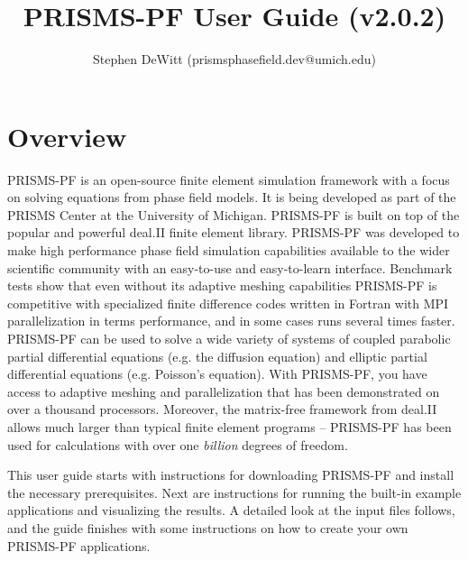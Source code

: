 \documentclass[10pt]{article} %
\title{PRISMS-PF User Guide (v2.0.2)}
\author{Stephen DeWitt (prismsphasefield.dev@umich.edu)}
\begin{document}
\posttitle{\end{center}}

\begin{titlingpage}
\maketitle
\end{titlingpage}
\tableofcontents

\clearpage

\section{Overview}
PRISMS-PF is an open-source finite element simulation framework with a focus on solving equations from phase field models. It is being developed as part of the PRISMS Center at the University of Michigan. PRISMS-PF is built on top of the popular and powerful deal.II finite element library. PRISMS-PF was developed to make high performance phase field simulation capabilities available to the wider scientific community with an easy-to-use and easy-to-learn interface. Benchmark tests show that even without its adaptive meshing capabilities PRISMS-PF is competitive with specialized finite difference codes written in Fortran with MPI parallelization in terms performance,  and in some cases runs several times faster. PRISMS-PF can be used to solve a wide variety of systems of coupled parabolic partial differential equations (e.g. the diffusion equation) and elliptic partial differential equations (e.g. Poisson's equation). With PRISMS-PF, you have access to adaptive meshing and parallelization that has been demonstrated on over a thousand processors. Moreover, the matrix-free framework from deal.II allows much larger than typical finite element programs -- PRISMS-PF has been used for calculations with over one \emph{billion} degrees of freedom.

This user guide starts with instructions for downloading PRISMS-PF and install the necessary prerequisites. Next are instructions for running the built-in example applications and visualizing the results. A detailed look at the input files follows, and the guide finishes with some instructions on how to create your own PRISMS-PF applications.
\end{document}

